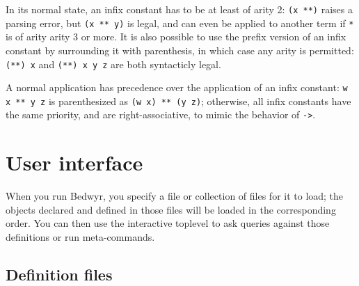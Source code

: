 \documentclass{article}
\begin{document}
In its normal state, an infix constant has to be at least of arity 2:
{\tt (x **)} raises a parsing error, but {\tt (x ** y)} is legal, and can
even be applied to another term if {\tt **} is of arity arity 3 or more.
It is also possible to use the prefix version of an infix constant by
surrounding it with parenthesis, in which case any arity is permitted:
{\tt (**) x} and {\tt (**) x y z} are both syntacticly legal.

A normal application has precedence over the application of an infix
constant: {\tt w x ** y z} is parenthesized as {\tt (w x) ** (y z)};
otherwise, all infix constants have the same priority, and are
right-associative, to mimic the behavior of {\tt ->}.



\section{User interface}

When you run Bedwyr, you specify a file or collection of files for it to
load; the objects declared and defined in those files will be loaded in
the corresponding order. You can then use the interactive toplevel to
ask queries against those definitions or run meta-commands.

\subsection{Definition files}
\end{document}
